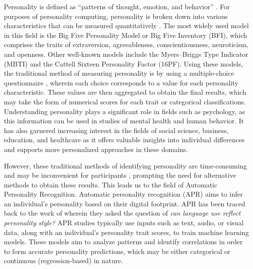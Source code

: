 
Personality is defined as “patterns of thought, emotion, and behavior” \citep{Vinciarelli2014}. For purposes of personality computing, personality is broken down into various characteristics that can be measured quantitatively \citep{Vinciarelli2014}. The most widely used model in this field is the Big Five Personality Model or Big Five Inventory (BFI), which comprises the traits of extraversion, agreeableness, conscientiousness, neuroticism, and openness. Other well-known models include the Myers–Briggs Type Indicator (MBTI) and the Cattell Sixteen Personality Factor (16PF). Using these models, the traditional method of measuring personality is by using a multiple-choice questionnaire \citep{farnadi2018}, wherein each choice corresponds to a value for each personality characteristic. These values are then aggregated to obtain the final results, which may take the form of numerical scores for each trait or categorical classifications. Understanding personality plays a significant role in fields such as psychology, as this information can be used in studies of mental health and human behavior. It has also garnered increasing interest in the fields of social science, business, education, and healthcare \citep{Miller2014} as it offers valuable insights into individual differences and supports more personalized approaches in these domains.

However, these traditional methods of identifying personality are time-consuming and may be inconvenient for participants \citep{chen2016}, prompting the need for alternative methods to obtain these results. This leads us to the field of Automatic Personality Recognition. Automatic personality recognition (APR) aims to infer an individual’s personality based on their digital footprint. APR has been traced back to the work of \citet{Pennebaker1999} wherein they asked the question of \textit{can language use reflect personality style?} APR studies typically use inputs such as text, audio, or visual data, along with an individual’s personality trait scores, to train machine learning models. These models aim to analyze patterns and identify correlations in order to form accurate personality predictions, which may be either categorical or continuous (regression-based) in nature.



